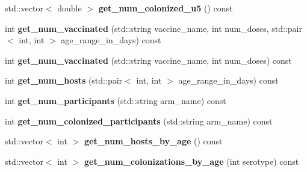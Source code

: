 \begin{DoxyCompactItemize}
\mbox{\label{class_population_1_1_statistics_aef91594d7c5f185e8fe64c92f4fd5c4b}} 
std\+::vector$<$ double $>$ {\bfseries get\+\_\+num\+\_\+colonized\+\_\+u5} () const
\item 
\mbox{\label{class_population_1_1_statistics_a557a9411699847a0b6aae74749db0ea1}} 
int {\bfseries get\+\_\+num\+\_\+vaccinated} (std\+::string vaccine\+\_\+name, int num\+\_\+doses, std\+::pair$<$ int, int $>$ age\+\_\+range\+\_\+in\+\_\+days) const
\item 
\mbox{\label{class_population_1_1_statistics_a419d30b999953c778ab9c29b6bf46503}} 
int {\bfseries get\+\_\+num\+\_\+vaccinated} (std\+::string vaccine\+\_\+name, int num\+\_\+doses) const
\item 
\mbox{\label{class_population_1_1_statistics_aa3cb65188e8992106f60088cde3060d4}} 
int {\bfseries get\+\_\+num\+\_\+hosts} (std\+::pair$<$ int, int $>$ age\+\_\+range\+\_\+in\+\_\+days) const
\item 
\mbox{\label{class_population_1_1_statistics_a37ef91ff6a681a5491328b441239f762}} 
int {\bfseries get\+\_\+num\+\_\+participants} (std\+::string arm\+\_\+name) const
\item 
\mbox{\label{class_population_1_1_statistics_a00a3f35a344c659c9f832d8b48669d4e}} 
int {\bfseries get\+\_\+num\+\_\+colonized\+\_\+participants} (std\+::string arm\+\_\+name) const
\item 
\mbox{\label{class_population_1_1_statistics_ae8703b6c41e1e1574c26108db95c805c}} 
std\+::vector$<$ int $>$ {\bfseries get\+\_\+num\+\_\+hosts\+\_\+by\+\_\+age} () const
\item 
\mbox{\label{class_population_1_1_statistics_a1b5a2ee32732efd5f560e8b755772b33}} 
std\+::vector$<$ int $>$ {\bfseries get\+\_\+num\+\_\+colonizations\+\_\+by\+\_\+age} (int serotype) const
\item 
\mbox{\label{class_population_1_1_statistics_a569c1f75dab6e38ff029ffda60ce61e4}} 

\end{DoxyCompactItemize}
